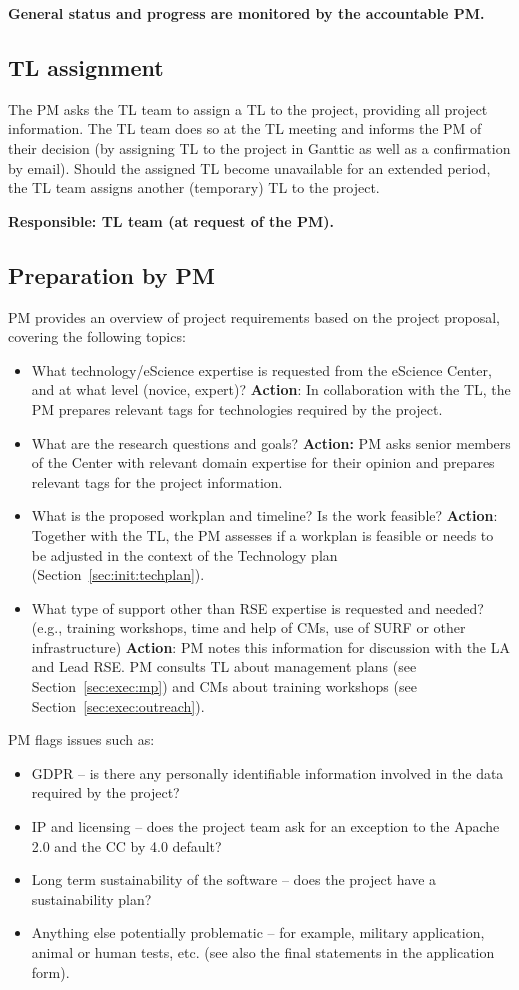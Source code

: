 \textbf{General status and progress are monitored by the accountable PM.}

\subsection{TL assignment}
The PM asks the TL team to assign a TL to the project, providing all project information. The TL team does so at the TL
meeting and informs the PM of their decision (by assigning TL to the project in Ganttic as well as a confirmation by
email). Should the assigned TL become unavailable for an extended period, the TL team assigns another (temporary) TL to
the project.

\textbf{Responsible: TL team (at request of the PM).}

\subsection{Preparation by PM}
PM provides an overview of project requirements based on the project proposal, covering the following topics:

\begin{itemize}
\item What technology/eScience expertise is requested from the eScience Center, and at what level (novice, expert)?
\textbf{Action}: In collaboration with the TL, the PM prepares relevant tags for technologies required by the project.
\item What are the research questions and goals? \textbf{Action:} PM asks senior members of the Center with relevant domain
expertise for their opinion and prepares relevant tags for the project information.
\item What is the proposed workplan and timeline? Is the work feasible? \textbf{Action}: Together with the TL, the PM assesses
if a workplan is feasible or needs to be adjusted in the context of the Technology plan (Section~\ref{sec:init:techplan}).
\item What type of support other than RSE expertise is requested and needed? (e.g., training workshops, time and help of CMs,
use of SURF or other infrastructure) \textbf{Action}: PM notes this information for discussion with the LA and Lead
RSE. PM consults TL about management plans (see Section~\ref{sec:exec:mp}) and CMs about training workshops (see
Section~\ref{sec:exec:outreach}).
\end{itemize}
PM flags issues such as:
\begin{itemize}
\item GDPR – is there any personally identifiable information involved in the data required by the project? 
\item IP and licensing – does the project team ask for an exception to the Apache 2.0 and the CC by 4.0 default? 
\item Long term sustainability of the software – does the project have a sustainability plan? 
\item Anything else potentially problematic – for example, military application, animal or human tests, etc. (see also the
final statements in the application form).
\end{itemize}

